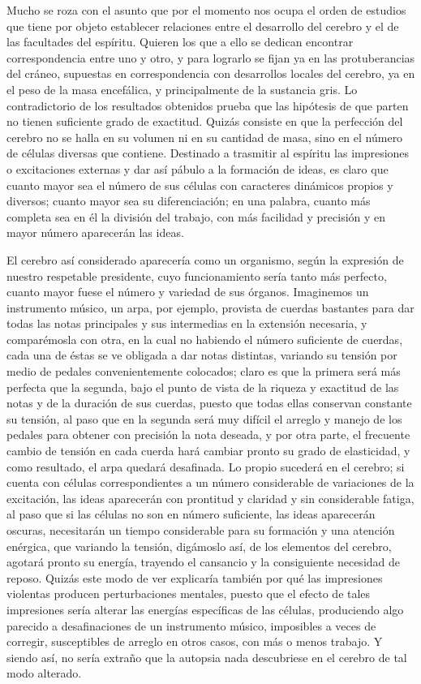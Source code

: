 \documentclass[a4paper, 12pt]{article}
\begin{document}
Mucho se roza con el asunto que por el momento nos ocupa el orden de estudios que tiene por objeto establecer relaciones entre el desarrollo del cerebro y el de las facultades del espíritu. Quieren los que a ello se dedican encontrar correspondencia entre uno y otro, y para lograrlo se fijan ya en las protuberancias del cráneo, supuestas en correspondencia con desarrollos locales del cerebro, ya en el peso de la masa encefálica, y principalmente de la sustancia gris. Lo contradictorio de los resultados obtenidos prueba que las hipótesis de que parten no tienen suficiente grado de exactitud. Quizás consiste en que la perfección del cerebro no se halla en su volumen ni en su cantidad de masa, sino en el número de células diversas que contiene. Destinado a trasmitir al espíritu las impresiones o excitaciones externas y dar así pábulo a la formación de ideas, es claro que cuanto mayor sea el número de sus células con caracteres dinámicos propios y diversos; cuanto mayor sea su diferenciación; en una palabra, cuanto más completa sea en él la división del  trabajo, con más facilidad y precisión y en mayor número aparecerán las ideas.

El cerebro así considerado aparecería como un organismo, según la expresión de nuestro respetable presidente, cuyo funcionamiento sería tanto más perfecto, cuanto mayor fuese el número y variedad de sus órganos. Imaginemos un instrumento músico, un arpa, por ejemplo, provista de cuerdas bastantes para dar todas las notas principales y sus intermedias en la extensión necesaria, y comparémosla con otra, en la cual no habiendo el número suficiente de cuerdas, cada una de éstas se ve obligada a dar notas distintas, variando su tensión por medio de pedales convenientemente colocados; claro es que la primera será más perfecta que la segunda, bajo el punto de vista de la riqueza y exactitud de las notas y de la duración de sus cuerdas, puesto que todas ellas conservan constante su tensión, al paso que en la segunda será muy difícil el arreglo y manejo de los pedales para obtener con precisión la nota deseada, y por otra parte, el frecuente cambio de tensión en cada cuerda hará cambiar pronto su grado de elasticidad, y como resultado, el arpa quedará desafinada. Lo propio sucederá en el cerebro; si cuenta con células correspondientes a un número considerable de variaciones de la excitación, las ideas aparecerán con prontitud y claridad y sin considerable fatiga, al paso que si las células no son en número suficiente, las ideas aparecerán oscuras, necesitarán un tiempo considerable para su formación y una atención enérgica, que variando la tensión, digámoslo así, de los elementos del cerebro, agotará pronto su energía, trayendo el cansancio y la consiguiente necesidad de reposo. Quizás este modo de ver explicaría también por qué las impresiones violentas producen perturbaciones mentales, puesto que el efecto de tales impresiones sería alterar las energías específicas de las células, produciendo algo parecido a desafinaciones de un instrumento músico, imposibles a veces de corregir, susceptibles de arreglo en otros casos, con más o menos trabajo. Y siendo así, no sería extraño que la autopsia nada descubriese en el cerebro de tal modo alterado.
\end{document}
